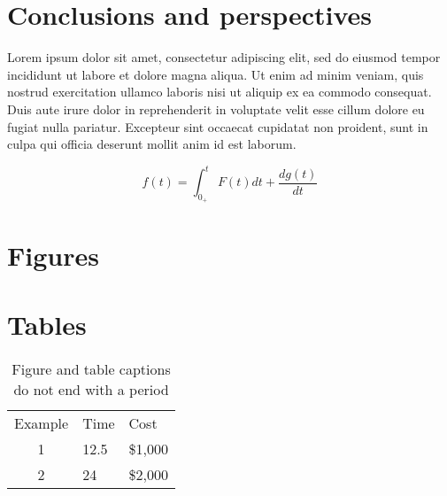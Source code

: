 \documentclass[twocolumn,10pt]{asme2ej}
\begin{document}
\section{Conclusions and perspectives}

Lorem ipsum dolor sit amet, consectetur adipiscing elit, sed do eiusmod tempor incididunt ut labore et dolore magna aliqua. Ut enim ad minim veniam, quis nostrud exercitation ullamco laboris nisi ut aliquip ex ea commodo consequat. Duis aute irure dolor in reprehenderit in voluptate velit esse cillum dolore eu fugiat nulla pariatur. Excepteur sint occaecat cupidatat non proident, sunt in culpa qui officia deserunt mollit anim id est laborum.

\begin{equation}
f(t) = \int_{0_+}^t F(t) dt + \frac{d g(t)}{d t}
\label{eq_ASME}
\end{equation}

\section{Figures}
\label{sect_figure}


\section{Tables}

\begin{table}[t]
\caption{Figure and table captions do not end with a period}
\begin{center}
\label{table_ASME}
\begin{tabular}{c l l}
& & \\ %
\hline
Example & Time & Cost \\
\hline
1 & 12.5 & \$1,000 \\
2 & 24 & \$2,000 \\
\hline
\end{tabular}
\end{center}
\end{table}
\end{document}
